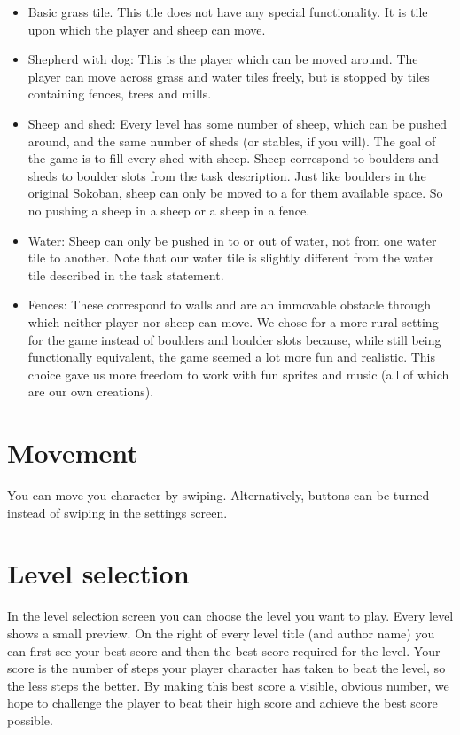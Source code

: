 \documentclass{article}
\begin{document}
\begin{itemize}
	\item Basic grass tile. This tile does not have any special functionality. It is tile upon which the player and sheep can move.
	\item Shepherd with dog: This is the player which can be moved around. The player can move across grass and water tiles freely, but is stopped by tiles containing fences, trees and mills.
	\item Sheep and shed: Every level has some number of sheep, which can be pushed around, and the same number of sheds (or stables, if you will). The goal of the game is to fill every shed with sheep. Sheep correspond to boulders and sheds to boulder slots from the task description. Just like boulders in the original Sokoban, sheep can only be moved to a for them available space. So no pushing a sheep in a sheep or a sheep in a fence.
	\item Water: Sheep can only be pushed in to or out of water, not from one water tile to another. Note that our water tile is slightly different from the water tile described in the task statement.
	\item Fences: These correspond to walls and are an immovable obstacle through which neither player nor sheep can move.
	We chose for a more rural setting for the game instead of boulders and boulder slots because, while still being functionally equivalent, the game seemed a lot more fun and realistic. This choice gave us more freedom to work with fun sprites and music (all of which are our own creations).
\end{itemize}

\section*{Movement}
You can move you character by swiping. Alternatively, buttons can be turned instead of swiping in the settings screen.

\section*{Level selection}
In the level selection screen you can choose the level you want to play. Every level shows a small preview. On the right of every level title (and author name) you can first see your best score and then the best score required for the level. Your score is the number of steps your player character has taken to beat the level, so the less steps the better. By making this best score a visible, obvious number, we hope to challenge the player to beat their high score and achieve the best score possible.
\end{document}
